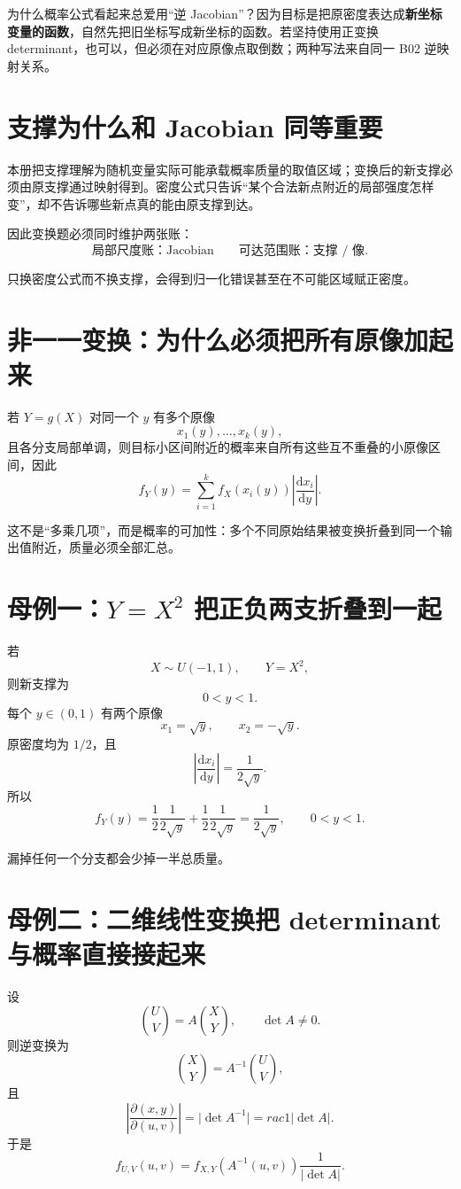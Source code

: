 \documentclass[profile=standard]{ipara-handbook}
\begin{document}
为什么概率公式看起来总爱用“逆 Jacobian”？因为目标是把原密度表达成\textbf{新坐标变量的函数}，自然先把旧坐标写成新坐标的函数。若坚持使用正变换 determinant，也可以，但必须在对应原像点取倒数；两种写法来自同一 B02 逆映射关系。

\section{支撑为什么和 Jacobian 同等重要}
本册把支撑理解为随机变量实际可能承载概率质量的取值区域；变换后的新支撑必须由原支撑通过映射得到。密度公式只告诉“某个合法新点附近的局部强度怎样变”，却不告诉哪些新点真的能由原支撑到达。

因此变换题必须同时维护两张账：
\[
\boxed{\text{局部尺度账：Jacobian}}
\qquad
\boxed{\text{可达范围账：支撑 / 像}.}
\]

只换密度公式而不换支撑，会得到归一化错误甚至在不可能区域赋正密度。

\section{非一一变换：为什么必须把所有原像加起来}
若 $Y=g(X)$ 对同一个 $y$ 有多个原像
\[
x_1(y),\dots,x_k(y),
\]
且各分支局部单调，则目标小区间附近的概率来自所有这些互不重叠的小原像区间，因此
\[
\boxed{
f_Y(y)=\sum_{i=1}^k f_X(x_i(y))\left\lvert\frac{\mathrm{d}x_i}{\mathrm{d}y}\right\rvert.}
\]

这不是“多乘几项”，而是概率的可加性：多个不同原始结果被变换折叠到同一个输出值附近，质量必须全部汇总。

\section{母例一：$Y=X^2$ 把正负两支折叠到一起}
若
\[
X\sim U(-1,1),
\qquad Y=X^2,
\]
则新支撑为
\[
0<y<1.
\]
每个 $y\in(0,1)$ 有两个原像
\[
x_1=\sqrt y,
\qquad x_2=-\sqrt y.
\]
原密度均为 $1/2$，且
\[
\left\lvert\frac{\mathrm{d}x_i}{\mathrm{d}y}\right\rvert=\frac1{2\sqrt y}.
\]
所以
\[
f_Y(y)
=\frac12\frac1{2\sqrt y}
+\frac12\frac1{2\sqrt y}
=\frac1{2\sqrt y},
\qquad 0<y<1.
\]

漏掉任何一个分支都会少掉一半总质量。

\section{母例二：二维线性变换把 determinant 与概率直接接起来}
设
\[
\binom UV=A\binom XY,
\qquad \det A\neq0.
\]
则逆变换为
\[
\binom XY=A^{-1}\binom UV,
\]
且
\[
\left\lvert\frac{\partial(x,y)}{\partial(u,v)}\right\rvert
=\lvert\det A^{-1}\rvert=rac1{\lvert\det A\rvert}.
\]
于是
\[
\boxed{
f_{U,V}(u,v)=f_{X,Y}(A^{-1}(u,v))\frac1{\lvert\det A\rvert}.}
\]
\end{document}
